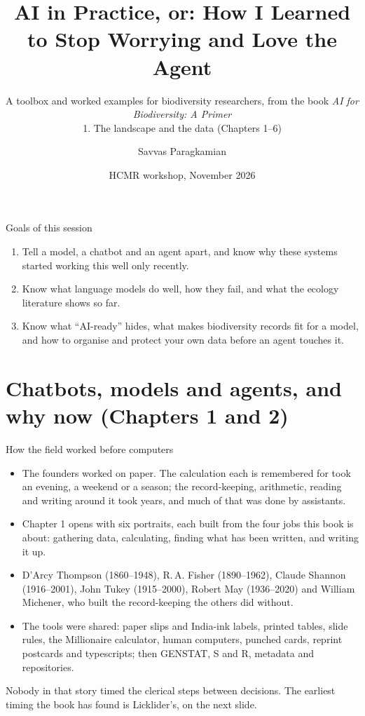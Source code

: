 \documentclass[11pt,aspectratio=169]{beamer}
\title[AI in Practice 1]{AI in Practice, or: How I Learned to Stop Worrying and Love the Agent}
\subtitle{A toolbox and worked examples for biodiversity researchers, from the book \emph{AI for Biodiversity: A Primer}\\[0.6em] 1. The landscape and the data (Chapters 1--6)}
\author{Savvas Paragkamian}
\institute{Hellenic Centre for Marine Research \\ KYBELE and ELIXIR-GR}
\date{HCMR workshop, November 2026}
\begin{document}
\begin{frame}[plain]
  \titlepage
\end{frame}

\begin{frame}{Goals of this session}
  \begin{enumerate}
    \item Tell a model, a chatbot and an agent apart, and know why these
      systems started working this well only recently.
    \item Know what language models do well, how they fail, and what the
      ecology literature shows so far.
    \item Know what ``AI-ready'' hides, what makes biodiversity records fit for
      a model, and how to organise and protect your own data before an agent
      touches it.
  \end{enumerate}
\end{frame}

\section{Chatbots, models and agents, and why now (Chapters 1 and 2)}

\begin{frame}{How the field worked before computers}
  \small
  \begin{itemize}
    \item The founders worked on paper. The calculation each is remembered for
      took an evening, a weekend or a season; the record-keeping, arithmetic,
      reading and writing around it took years, and much of that was done by
      assistants.
    \item Chapter 1 opens with six portraits, each built from the four jobs
      this book is about: gathering data, calculating, finding what has been
      written, and writing it up.
    \item D'Arcy Thompson (1860--1948), R.\,A. Fisher (1890--1962), Claude
      Shannon (1916--2001), John Tukey (1915--2000), Robert May (1936--2020)
      and William Michener, who built the record-keeping the others did
      without.
    \item The tools were shared: paper slips and India-ink labels, printed
      tables, slide rules, the Millionaire calculator, human computers,
      punched cards, reprint postcards and typescripts; then GENSTAT, S and R,
      metadata and repositories.
  \end{itemize}
  \medskip
  Nobody in that story timed the clerical steps between decisions. The
  earliest timing the book has found is Licklider's, on the next slide.
\end{frame}
\end{document}

